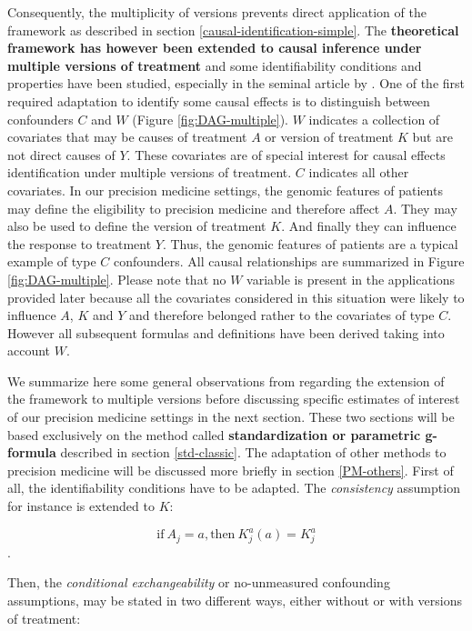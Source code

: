 \documentclass[a4paper,12pt,twoside,onecolumn,openright,final,oldfontcommands]{memoir}
\begin{document}
Consequently, the multiplicity of versions prevents direct application
of the framework as described in section
\ref{causal-identification-simple}. The \textbf{theoretical framework
has however been extended to causal inference under multiple versions of
treatment} and some identifiability conditions and properties have been
studied, especially in the seminal article by
\citet{vanderweele2013causal}. One of the first required adaptation to
identify some causal effects is to distinguish between confounders \(C\)
and \(W\) (Figure \ref{fig:DAG-multiple}). \(W\) indicates a collection
of covariates that may be causes of treatment \(A\) or version of
treatment \(K\) but are not direct causes of \(Y\). These covariates are
of special interest for causal effects identification under multiple
versions of treatment. \(C\) indicates all other covariates. In our
precision medicine settings, the genomic features of patients may define
the eligibility to precision medicine and therefore affect \(A\). They
may also be used to define the version of treatment \(K\). And finally
they can influence the response to treatment \(Y\). Thus, the genomic
features of patients are a typical example of type \(C\) confounders.
All causal relationships are summarized in Figure
\ref{fig:DAG-multiple}. Please note that no \(W\) variable is present in
the applications provided later because all the covariates considered in
this situation were likely to influence \(A\), \(K\) and \(Y\) and
therefore belonged rather to the covariates of type \(C\). However all
subsequent formulas and definitions have been derived taking into
account \(W\).

We summarize here some general observations from
\citet{vanderweele2013causal} regarding the extension of the framework
to multiple versions before discussing specific estimates of interest of
our precision medicine settings in the next section. These two sections
will be based exclusively on the method called \textbf{standardization
or parametric g-formula} described in section \ref{std-classic}. The
adaptation of other methods to precision medicine will be discussed more
briefly in section \ref{PM-others}. First of all, the identifiability
conditions have to be adapted. The \emph{consistency} assumption for
instance is extended to \(K\):

\[\textrm{if} \: A_j=a,  \textrm{then} \: K_j^a(a)=K_j^a\].

Then, the \emph{conditional exchangeability} or no-unmeasured
confounding assumptions, may be stated in two different ways, either
without or with versions of treatment:
\end{document}
